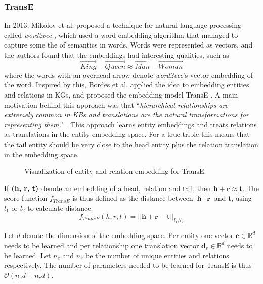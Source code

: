 \subsubsection{TransE}
\label{TransE_peaked_in_2013}
In 2013, Mikolov et al. proposed a technique for natural language processing called \textit{word2vec} \cite{mikolov2013distributed,mikolov2013efficient}, which used a word-embedding algorithm that managed to capture some the of semantics in words. Words were represented as vectors, and the authors found that the embeddings had interesting qualities, such as
\[\overrightarrow{King} - \overrightarrow{Queen} \approx \overrightarrow{Man} -\overrightarrow{Woman}\]
where the words with an overhead arrow denote \textit{word2vec}'s vector embedding of the word. Inspired by this, Bordes et al. applied the idea to embedding entities and relations in KGs, and proposed the embedding model TransE \cite{TransE}. A main motivation behind this approach was that ``\textit{hierarchical relationships are extremely common in KBs and translations are the natural transformations for representing them.}" \cite{TransE}. This approach learns entity embeddings and treats relations as translations in the entity embedding space.  For a true triple this means that the tail entity should be very close to the head entity plus the relation translation in the embedding space. 

\begin{figure}[htp]
    \centering
    
    \caption[TransE embedding.]{Visualization of entity and relation embedding for TransE.}
    \label{IKEA_TransE}
\end{figure}

If $\text{\textbf{(h, r, t)}}$ denote an embedding of a head, relation and tail, then $\textbf{h} + \textbf{r} \approx \textbf{t}$. The score function $f_{TransE}$ is thus defined as the distance between $\textbf{h} + \textbf{r}$ and $\textbf{t}$, using $l_1$ or $l_2$ to calculate distance:
\[f_{TransE}(h, r, t) = ||\textbf{h} + \textbf{r} - \textbf{t}||_{l_1/l_2}\]

Let $d$ denote the dimension of the embedding space. Per entity one vector $\textbf{e}\in \mathbb{R}^d$ needs to be learned and per relationship one translation vector $\textbf{d}_r\in \mathbb{R}^d$ needs to be learned. Let $n_e$ and $n_r$ be the number of unique entities and relations respectively. The number of parameters needed to be learned for TransE is thus $\mathcal{O}(n_e d + n_r d)$.


